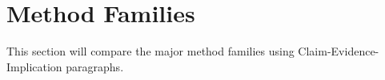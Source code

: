 \section{Method Families}

This section will compare the major method families using Claim-Evidence-Implication paragraphs.


